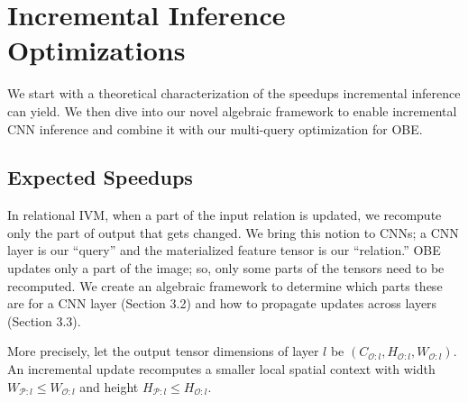 \section{Incremental Inference Optimizations}\label{sec:exact}
We start with a theoretical characterization of the speedups incremental inference can yield. We then dive into our novel algebraic framework to enable incremental CNN inference and combine it with our multi-query optimization for OBE.


\vspace{-2mm}
\subsection{Expected Speedups}

In relational IVM, when a part of the input relation is updated, we recompute only the part of output that gets changed. We bring this notion to CNNs; a CNN layer is our ``query'' and the materialized feature tensor is our ``relation.'' OBE updates only a part of the image; so, only some parts of the tensors need to be recomputed. We create an algebraic framework to determine which parts these are for a CNN layer (Section 3.2) and how to propagate updates across layers (Section 3.3). 

More precisely, let the output tensor dimensions of layer $l$ be $(C_{\mathcal{O}:l} , H_{\mathcal{O}:l} , W_{\mathcal{O}:l})$. An incremental update recomputes a smaller local spatial context with width $W_{\mathcal{P}:l} \le W_{\mathcal{O}:l}$ and height $H_{\mathcal{P}:l} \le H_{\mathcal{O}:l}$.

